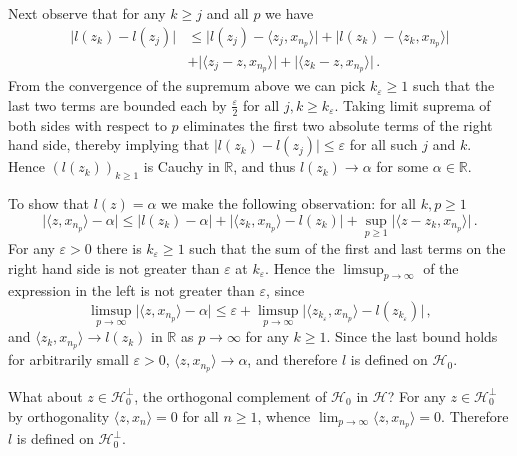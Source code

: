 \documentclass[a4paper]{article}
\newcommand{\Hcal}{\mathcal{H}}
\newcommand{\real}{\mathbb{R}}
\begin{document}
Next observe that for any $k \geq j$ and all $p$ we have
\begin{align*}
  \lvert l(z_k) - l(z_j) \rvert
    &\leq \lvert l(z_j) - \langle z_j, x_{n_p} \rangle \rvert
      + \lvert l(z_k) - \langle z_k, x_{n_p} \rangle \rvert
    \\
    &+ \lvert \langle z_j - z, x_{n_p} \rangle \rvert
      + \lvert \langle z_k - z, x_{n_p} \rangle \rvert
      \,.
\end{align*}
From the convergence of the supremum above we can pick $k_\varepsilon \geq1$ such
that the last two terms are bounded each by $\tfrac\varepsilon2$ for all $j,k \geq
k_\varepsilon$. Taking limit suprema of both sides with respect to $p$ eliminates
the first two absolute terms of the right hand side, thereby implying that
$\lvert l(z_k) - l(z_j) \rvert \leq \varepsilon$ for all such $j$ and $k$. Hence
$(l(z_k))_{k\geq 1}$ is Cauchy in $\real$, and thus $l(z_k) \to \alpha$ for some
$\alpha \in \real$.

To show that $l(z) = \alpha$ we make the following observation: for all $k,p\geq 1$
\begin{equation*}
  \lvert \langle z, x_{n_p} \rangle - \alpha \rvert
    \leq \lvert l(z_k) - \alpha \rvert
    + \lvert \langle z_k, x_{n_p} \rangle - l(z_k) \rvert
    + \sup_{p\geq 1} \lvert \langle z - z_k, x_{n_p} \rangle \rvert
    \,.
\end{equation*}
For any $\varepsilon > 0$ there is $k_\varepsilon \geq 1$ such that the sum of the
first and last terms on the right hand side is not greater than $\varepsilon$ at
$k_\varepsilon$. Hence the $\limsup_{p\to \infty}$ of the expression in the left
is not greater than $\varepsilon$, since
\begin{equation*}
  \limsup_{p\to \infty} \lvert \langle z, x_{n_p} \rangle - \alpha \rvert
    \leq \varepsilon
    + \limsup_{p\to \infty} \lvert
        \langle z_{k_\varepsilon}, x_{n_p} \rangle - l(z_{k_\varepsilon})
      \rvert
    \,,
\end{equation*}
and $\langle z_k, x_{n_p} \rangle \to l(z_k)$ in $\real$ as $p\to \infty$ for any
$k \geq 1$. Since the last bound holds for arbitrarily small $\varepsilon > 0$,
$\langle z, x_{n_p} \rangle \to \alpha$, and therefore $l$ is defined on $\Hcal_0$.

What about $z\in \Hcal_0^\perp$, the orthogonal complement of $\Hcal_0$ in $\Hcal$?
For any $z\in \Hcal_0^\perp$ by orthogonality $\langle z, x_n \rangle = 0$ for all
$n\geq 1$, whence $\lim_{p\to\infty} \langle z, x_{n_p} \rangle = 0$. Therefore $l$
is defined on $\Hcal_0^\perp$.
\end{document}
